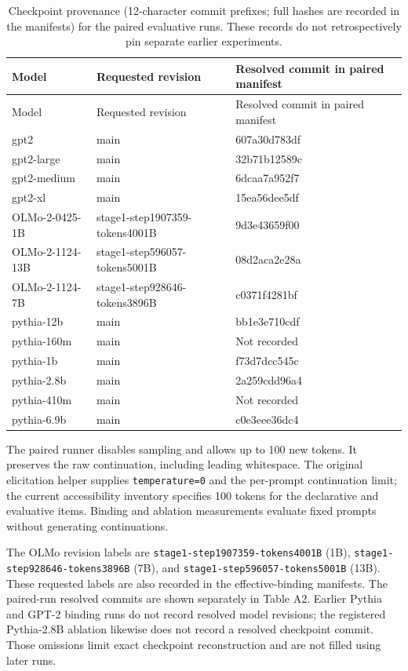 \documentclass[
  english,
]{article}
\begin{document}
\begingroup\small
\begin{longtable}[]{@{}lll@{}}
\caption{Checkpoint provenance (12-character commit prefixes; full hashes are recorded in the manifests) for the paired evaluative runs. These records do not retrospectively pin separate earlier experiments. \label{tab:revisions}}\tabularnewline
\toprule\noalign{}
Model & Requested revision & Resolved commit in paired manifest \\
\midrule\noalign{}
\endfirsthead
\toprule\noalign{}
Model & Requested revision & Resolved commit in paired manifest \\
\midrule\noalign{}
\endhead
\bottomrule\noalign{}
\endlastfoot
gpt2 & main & 607a30d783df \\
gpt2-large & main & 32b71b12589c \\
gpt2-medium & main & 6dcaa7a952f7 \\
gpt2-xl & main & 15ea56dee5df \\
OLMo-2-0425-1B & stage1-step1907359-tokens4001B & 9d3e43659f00 \\
OLMo-2-1124-13B & stage1-step596057-tokens5001B & 08d2aca2e28a \\
OLMo-2-1124-7B & stage1-step928646-tokens3896B & c0371f4281bf \\
pythia-12b & main & bb1e3e710cdf \\
pythia-160m & main & Not recorded \\
pythia-1b & main & f73d7dcc545c \\
pythia-2.8b & main & 2a259cdd96a4 \\
pythia-410m & main & Not recorded \\
pythia-6.9b & main & c0e3eee36dc4 \\
\end{longtable}
\endgroup

The paired runner disables sampling and allows up to 100 new tokens. It preserves the raw continuation, including leading whitespace. The original elicitation helper supplies \texttt{temperature=0} and the per-prompt continuation limit; the current accessibility inventory specifies 100 tokens for the declarative and evaluative items. Binding and ablation measurements evaluate fixed prompts without generating continuations.

The OLMo revision labels are \texttt{stage1-step1907359-tokens4001B} (1B), \texttt{stage1-step928646-tokens3896B} (7B), and \texttt{stage1-step596057-tokens5001B} (13B). These requested labels are also recorded in the effective-binding manifests. The paired-run resolved commits are shown separately in Table A2. Earlier Pythia and GPT-2 binding runs do not record resolved model revisions; the registered Pythia-2.8B ablation likewise does not record a resolved checkpoint commit. Those omissions limit exact checkpoint reconstruction and are not filled using later runs.
\end{document}
